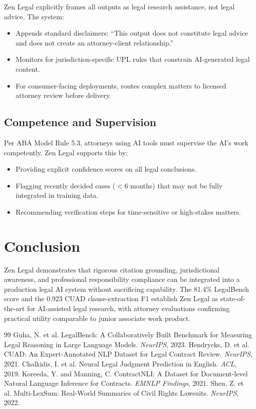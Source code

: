 \documentclass[11pt,a4paper]{article}
\begin{document}
Zen Legal explicitly frames all outputs as legal research assistance, not legal advice. The system:

\begin{itemize}
  \item Appends standard disclaimers: ``This output does not constitute legal advice and does not create an attorney-client relationship.''
  \item Monitors for jurisdiction-specific UPL rules that constrain AI-generated legal content.
  \item For consumer-facing deployments, routes complex matters to licensed attorney review before delivery.
\end{itemize}

\subsection{Competence and Supervision}

Per ABA Model Rule 5.3, attorneys using AI tools must supervise the AI's work competently. Zen Legal supports this by:

\begin{itemize}
  \item Providing explicit confidence scores on all legal conclusions.
  \item Flagging recently decided cases ($<$6 months) that may not be fully integrated in training data.
  \item Recommending verification steps for time-sensitive or high-stakes matters.
\end{itemize}

\section{Conclusion}

Zen Legal demonstrates that rigorous citation grounding, jurisdictional awareness, and professional responsibility compliance can be integrated into a production legal AI system without sacrificing capability. The 81.4\% LegalBench score and the 0.923 CUAD clause-extraction F1 establish Zen Legal as state-of-the-art for AI-assisted legal research, with attorney evaluations confirming practical utility comparable to junior associate work product.

\begin{thebibliography}{99}
 Guha, N. et al. LegalBench: A Collaboratively Built Benchmark for Measuring Legal Reasoning in Large Language Models. \textit{NeurIPS}, 2023.
 Hendrycks, D. et al. CUAD: An Expert-Annotated NLP Dataset for Legal Contract Review. \textit{NeurIPS}, 2021.
 Chalkidis, I. et al. Neural Legal Judgment Prediction in English. \textit{ACL}, 2019.
 Koreeda, Y. and Manning, C. ContractNLI: A Dataset for Document-level Natural Language Inference for Contracts. \textit{EMNLP Findings}, 2021.
 Shen, Z. et al. Multi-LexSum: Real-World Summaries of Civil Rights Lawsuits. \textit{NeurIPS}, 2022.
\end{thebibliography}
\end{document}
